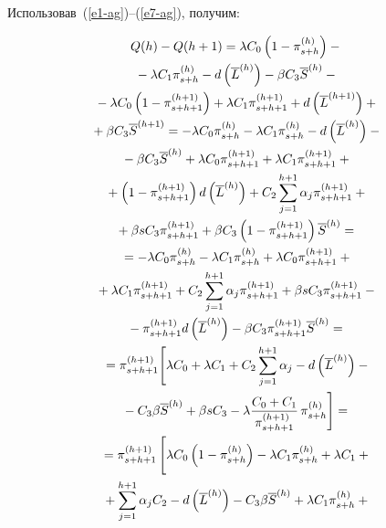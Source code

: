 \begin{multicols}{2}
  Использовав~(\ref{e1-ag})--(\ref{e7-ag}), получим:
  
  \vspace*{-6pt}
  
  \noindent
  \begin{multline*}
  Q(h)-Q(h+1) =\lambda C_0\left( 1-\pi^{(h)}_{s+h}\right) -{}\\
  {}- \lambda C_1 
\pi^{(h)}_{s+h} -d\left( \overline{L}^{(h)}\right) -\beta C_3 \overline{S}^{(h)}-{}\\
  {}-
  \lambda C_0\left( 1- \pi^{(h+1)}_{s+h+1}\right) +\lambda C_1 
\pi_{s+h+1}^{(h+1)} +d\left( \overline{L}^{(h+1)}\right) +{}\\
{}+\beta C_3  \overline{S}^{(h+1)}=
  -\lambda C_0\pi^{(h)}_{s+h} -\lambda C_1 \pi^{(h)}_{s+h} -d\left( 
\overline{L}^{(h)}\right) -{}\\
{}- \beta C_3 \overline{S}^{(h)} +\lambda  C_0\pi_{s+h+1}^{(h+1)}+\lambda C_1 \pi^{(h+1)}_{s+h+1}+{}\\
{}+\left( 1-\pi_{s+h+1}^{(h+1)}\right) d\left( \overline{L}^{(h)}\right)+
 C_2\sum\limits_{j=1}^{h+1} \alpha_j \pi_{s+h+1}^{(h+1)} 
+{}\\
{}+\beta s C_3 \pi_{s+h+1}^{(h+1)} +
\beta C_3\left( 1-\pi_{s+h+1}^{(h+1)}\right) \overline{S}^{(h)} ={}\\
{}= -\lambda C_0 
\pi^{(h)}_{s+h} -\lambda C_1\pi^{(h)}_{s+h} +\lambda C_0 \pi^{(h+1)}_{s+h+1} 
+{}\\
  {}+ \lambda C_1\pi_{s+h+1}^{(h+1)} +C_2\sum\limits_{j=1}^{h+1} \alpha_j 
\pi^{(h+1)}_{s+h+1}+\beta s C_3 \pi_{s+h+1}^{(h+1)} -{}\\
{}- \pi_{s+h+1}^{(h+1)} d\left( \overline{L}^{(h)}\right)-
 \beta C_3\pi^{(h+1)}_{s+h+1} \overline{S}^{(h)} ={}\\
 {}=\pi_{s+h+1}^{(h+1)} \Bigg[ 
\lambda C_0+\lambda C_1 +C_2\sum\limits_{j=1}^{h+1} \alpha_j -d\left( 
\overline{L}^{(h)}\right) - {}\\
  {}- C_3\beta \overline{S}^{(h)} +\beta s C_3 -\lambda 
\fr{C_0+C_1}{\pi^{(h+1)}_{s+h+1}}\,\pi^{(h)}_{s+h}
 \Bigg]={}\\
  {}=  \pi^{(h+1)}_{s+h+1} \left[
 \vphantom{\fr{C_0+C_1}{\pi^{(h+1)}_{s+h+1}}}
 \lambda C_0 \left( 1-\pi^{(h)}_{s+h}\right) -
\lambda C_1\pi^{(h)}_{s+h} +\lambda C_1 +{}\right.\\
{}+\sum\limits^{h+1}_{j=1} \alpha_j C_2 -
d\left( \overline{L}^{(h)}\right)- C_3\beta\overline{S}^{(h)} +\lambda C_1\pi^{(h)}_{s+h} +{}\\

\end{multline*}
\end{multicols}
